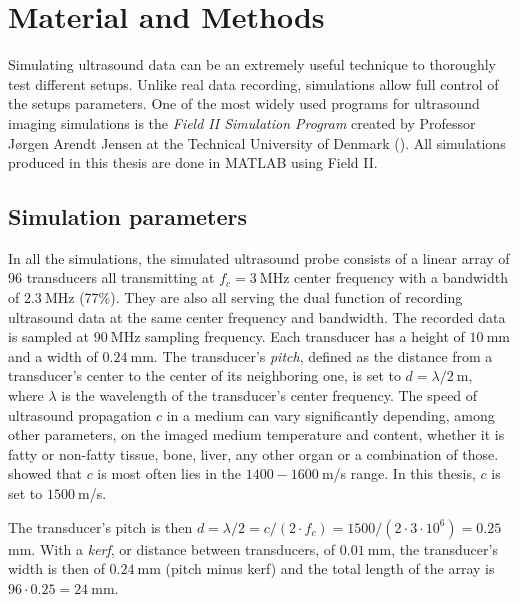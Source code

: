 \chapter{Material and Methods}
\label{chap:material}
Simulating ultrasound data can be an extremely useful technique to thoroughly test different setups. Unlike real data recording, simulations allow full control of the setups parameters.
One of the most widely used programs for ultrasound imaging simulations is the \textit{Field II Simulation Program}  created by Professor Jørgen Arendt Jensen at the Technical University of Denmark (\cite{Field_II, Field_II_ext}). All simulations produced in this thesis are done in MATLAB using Field II.

\section{Simulation parameters}
\label{sec:sim_param}
In all the simulations, the simulated ultrasound probe consists of a linear array of 96 transducers all transmitting at $f_c = 3~$MHz center frequency with a bandwidth of $2.3~$MHz (77\%). They are also all serving the dual function of recording ultrasound data at the same center frequency and bandwidth. The recorded data is sampled at $90~$MHz sampling frequency. Each transducer has a height of $10~$mm and a width of $0.24~$mm. The transducer's \textit{pitch}, defined as the distance from a transducer's center to the center of its neighboring one, is set to $d = \lambda / 2~$m, where $\lambda$ is the wavelength of the transducer's center frequency.
The speed of ultrasound propagation $c$ in a medium can vary significantly depending, among other parameters, on the imaged medium temperature and content, whether it is fatty or non-fatty tissue, bone, liver, any other organ or a combination of those. \cite{Ultrasound_propagation} showed that $c$ is most often lies in the $1400-1600~$m/s range. In this thesis, $c$ is set to $1500~$m/s.

The transducer's pitch is then $d = \lambda / 2 = c / (2 \cdot f_c) = 1500 / (2\cdot3\cdot10^6) = 0.25~$mm. With a \textit{kerf}, or distance between transducers, of $0.01~$mm, the transducer's width is then of $0.24~$mm (pitch minus kerf) and the total length of the array is $96 \cdot 0.25 = 24~$mm.


